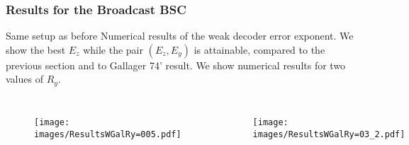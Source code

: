 \documentclass[mathserif]{beamer}
\begin{document}
\begin{frame}
\frametitle{Results for the Broadcast BSC}
\begin{block}{Same setup as before}
Numerical results of the weak decoder error exponent. We show the best $E_z$ while the pair $(E_z,E_y)$ is attainable, compared to the previous section and to Gallager 74' result. We show numerical results for two values of $R_y$.
\end{block}
\begin{columns} %
\begin{figure}[htp]
\centering
\texttt{[image: images/ResultsWGalRy=005.pdf]} \label{fig:EzMaxBeta}
\end{figure}

\begin{figure}[htp]
\centering
\texttt{[image: images/ResultsWGalRy=03\_2.pdf]}\label{fig:EyMaxBeta}
\end{figure}

\end{columns}
\end{frame}
\end{document}
